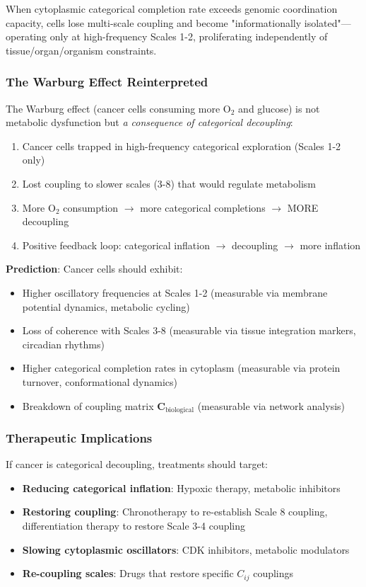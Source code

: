 \documentclass[11pt]{article}
\begin{document}
When cytoplasmic categorical completion rate exceeds genomic coordination capacity, cells lose multi-scale coupling and become "informationally isolated"—operating only at high-frequency Scales 1-2, proliferating independently of tissue/organ/organism constraints.

\subsubsection{The Warburg Effect Reinterpreted}

The Warburg effect (cancer cells consuming more O$_2$ and glucose) is not metabolic dysfunction but \textit{a consequence of categorical decoupling}:

\begin{enumerate}
\item Cancer cells trapped in high-frequency categorical exploration (Scales 1-2 only)
\item Lost coupling to slower scales (3-8) that would regulate metabolism
\item More O$_2$ consumption $\to$ more categorical completions $\to$ MORE decoupling
\item Positive feedback loop: categorical inflation $\to$ decoupling $\to$ more inflation
\end{enumerate}

\textbf{Prediction}: Cancer cells should exhibit:
\begin{itemize}
\item Higher oscillatory frequencies at Scales 1-2 (measurable via membrane potential dynamics, metabolic cycling)
\item Loss of coherence with Scales 3-8 (measurable via tissue integration markers, circadian rhythms)
\item Higher categorical completion rates in cytoplasm (measurable via protein turnover, conformational dynamics)
\item Breakdown of coupling matrix $\mathbf{C}_{\text{biological}}$ (measurable via network analysis)
\end{itemize}

\subsubsection{Therapeutic Implications}

If cancer is categorical decoupling, treatments should target:
\begin{itemize}
\item \textbf{Reducing categorical inflation}: Hypoxic therapy, metabolic inhibitors
\item \textbf{Restoring coupling}: Chronotherapy to re-establish Scale 8 coupling, differentiation therapy to restore Scale 3-4 coupling
\item \textbf{Slowing cytoplasmic oscillators}: CDK inhibitors, metabolic modulators
\item \textbf{Re-coupling scales}: Drugs that restore specific $C_{ij}$ couplings
\end{itemize}
\end{document}

